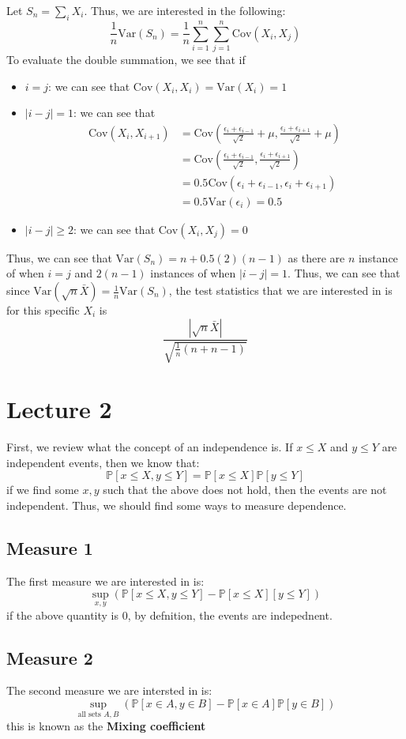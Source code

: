 \documentclass[12pt]{article}
\newcommand{\fP}{\mathbb{P}}
\newcommand{\Var}{\text{Var}}
\newcommand{\Cov}{\text{Cov}}
\begin{document}
Let $S_n = \sum_i X_i$. Thus, we are interested in the following:
\[
	\frac{1}{n}\Var(S_n) = \frac{1}{n} \sum_{i = 1}^n \sum_{j = 1}^n \Cov(X_i, X_j)
\]
To evaluate the double summation, we see that if 
\begin{itemize}
	\item $i = j$: we can see that $\Cov(X_i, X_i) = \Var(X_i) = 1$
	\item $|i- j| = 1$: we can see that \begin{align*}
			\Cov(X_i, X_{i+1}) &= \Cov\left(\frac{\epsilon_i + \epsilon_{i-1}}{\sqrt{2}} + \mu, \frac{\epsilon_i + \epsilon_{i+1}}{\sqrt{2}} + \mu \right) \\
					   &= \Cov\left(\frac{\epsilon_i + \epsilon_{i-1}}{\sqrt{2}}, \frac{\epsilon_i + \epsilon_{i+1}}{\sqrt{2}}\right) \\ 
					   &= 0.5 \Cov(\epsilon_i + \epsilon_{i - 1}, \epsilon_i + \epsilon_{i + 1}) \\ 
					   &= 0.5 \Var(\epsilon_i) = 0.5
		\end{align*}
	\item $|i -j | \geq 2$: we can see that $\Cov(X_i, X_{j}) = 0$
\end{itemize}
Thus, we can see that $\Var(S_n) = n + 0.5(2)(n-1)$ as there are $n$ instance of when $i = j$ and $2(n-1)$ instances of when $|i -j| = 1$. Thus, we can see that since $\Var(\sqrt{n}\bar{X}) = \frac{1}{n}\Var(S_n)$, the test statistics that we are interested in is for this specific $X_i$ is 
\[
	\frac{|\sqrt{n}\bar{X}|}{\sqrt{\frac{1}{n}(n + n-1)}}
\]
\section{Lecture 2}
First, we review what the concept of an independence is. If $x \leq X$ and $y \leq Y$ are independent events, then we know that:
\[
	\fP[x \leq X, y \leq Y] = \fP[x \leq X] \fP[y \leq Y]
\]
if we find some $x, y$ such that the above does not hold, then the events are not independent. Thus, we should find some ways to measure dependence. 
\subsection{Measure 1}
The first measure we are interested in is:
\[
	\sup_{x, y} \left( \fP[x \leq X, y \leq Y] - \fP[x \leq X][y \leq Y] \right)
\]
if the above quantity is 0, by defnition, the events are indepednent. 
\subsection{Measure 2}
The second measure we are intersted in is:
\[
	\sup_{\text{all sets } A, B} \left( \fP[x \in A, y \in B] - \fP[x \in A]\fP[y \in B] \right)
\]
this is known as the \textbf{Mixing coefficient}
\end{document}
